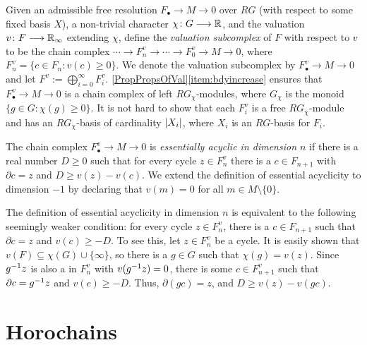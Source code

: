 \documentclass[11pt, letterpaper]{amsart}
\begin{document}
\begin{defn}
Given an admissible free resolution $F_\bullet \longrightarrow M \longrightarrow 0$ over $RG$ (with respect to some fixed basis $X$), a non-trivial character $\chi \colon G \longrightarrow \mathbb{R}$, and the valuation $v \colon F \longrightarrow \mathbb{R}_\infty$ extending $\chi$, define the \textit{valuation subcomplex} of $F$ with respect to $v$ to be the chain complex $\cdots \longrightarrow F_n^v \longrightarrow \cdots \longrightarrow F_0^v \longrightarrow M \longrightarrow 0$, where $F_n^v = \{c \in F_n : v(c) \geqslant 0\}$. We denote the valuation subcomplex by $F_\bullet^v \longrightarrow M \longrightarrow 0$ and let $F^v := \bigoplus_{i = 0}^\infty F_i^v$. \cref{PropPropsOfVal}\ref{item:bdyincrease} ensures that $F_\bullet^v \longrightarrow M \longrightarrow 0$ is a chain complex of left $RG_\chi$-modules, where $G_\chi$ is the monoid $\{g \in G : \chi(g) \geqslant 0\}$. It is not hard to show that each $F_i^v$ is a free $RG_\chi$-module and has an $RG_\chi$-basis of cardinality ${\left\vert X_i \right\vert}$, where $X_i$ is an $RG$-basis for $F_i$.

The chain  complex $F_\bullet^v \longrightarrow M \longrightarrow 0$ is \textit{essentially acyclic in dimension $n$} if there is a real number $D \geqslant 0$ such that for every cycle $z \in F_n^v$ there is a $c \in F_{n+1}$ with $\partial c = z$ and $D \geqslant v(z) - v(c)$. We extend the definition of essential acyclicity to dimension $-1$ by declaring that $v(m) = 0$ for all $m \in M \setminus \{0\}$.
\end{defn}

The definition of essential acyclicity in dimension $n$ is equivalent to the following seemingly weaker condition: for every cycle $z \in F_n^v$, there is a $c \in F_{n+1}$ such that $\partial c = z$ and $v(c) \geqslant -D$. To see this, let $z \in F_n^v$ be a cycle. It is easily shown that $v(F) \subseteq \chi(G) \cup \{\infty\}$, so there is a $g \in G$ such that $\chi(g) = v(z)$. Since $g^{-1} z$ is also a in $F_n^v$ with $v(g^{-1} z) = 0$, there is some $c \in F_{n+1}^v$ such that $\partial c = g^{-1} z$ and $v(c) \geqslant -D$. Thus, $\partial (gc) = z$, and $D \geqslant v(z) - v(gc)$.



\section{Horochains} \label{sec:horo}
\end{document}
